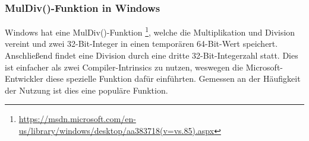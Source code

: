 \subsubsection{MulDiv()-Funktion in Windows}

Windows hat eine MulDiv()-Funktion
\footnote{\url{https://msdn.microsoft.com/en-us/library/windows/desktop/aa383718(v=vs.85).aspx}},
welche die Multiplikation und Division vereint und zwei 32-Bit-Integer in einen temporären 64-Bit-Wert
speichert. Anschließend findet eine Division durch eine dritte 32-Bit-Integerzahl statt.
Dies ist einfacher als zwei Compiler-Intrinsics zu nutzen, weswegen die Microsoft-Entwickler diese
spezielle Funktion dafür einführten.
Gemessen an der Häufigkeit der Nutzung ist dies eine populäre Funktion.

